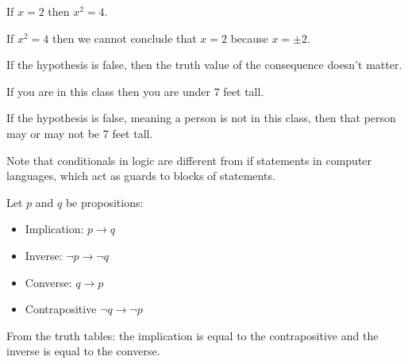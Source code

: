 \documentclass[letterpaper,12pt,fleqn]{article}
\renewcommand{\implies}{\rightarrow}
\begin{document}
\begin{example}
  If \(x=2\) then \(x^2=4\).

  If \(x^2=4\) then we cannot conclude that \(x=2\) because \(x=\pm2\).
\end{example}

If the hypothesis is false, then the truth value of the consequence doesn't matter.

\begin{example}
  If you are in this class then you are under 7 feet tall.

  If the hypothesis is false, meaning a person is not in this class, then that person may or may not be 7 feet
  tall.
\end{example}

Note that conditionals in logic are different from if statements in computer languages, which act as guards to
blocks of statements.

\begin{definition}
  Let \(p\) and \(q\) be propositions:
  \begin{itemize}
  \item Implication: \(p\implies q\)
  \item Inverse: \(\lnot p\implies \lnot q\)
  \item Converse: \(q\implies p\)
  \item Contrapositive \(\lnot q\implies \lnot p\)
  \end{itemize}
\end{definition}

From the truth tables: the implication is equal to the contrapositive and the inverse is equal to the converse.
\end{document}
